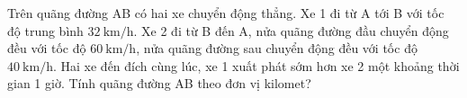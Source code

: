 \begin{ex}
	Trên quãng đường AB có hai xe chuyển động thẳng. Xe 1 đi từ A tới B với tốc độ trung bình $\SI{32}{\kilo\meter/\hour}$. Xe 2 đi từ B đến A, nửa quãng đường đầu chuyển động đều với tốc độ $\SI{60}{\kilo\meter/\hour}$, nửa quãng đường sau chuyển động đều với tốc độ $\SI{40}{\kilo\meter/\hour}$. Hai xe đến đích cùng lúc, xe 1 xuất phát sớm hơn xe 2 một khoảng thời gian 1 giờ. Tính quãng đường AB theo đơn vị kilomet?
\end{ex}
